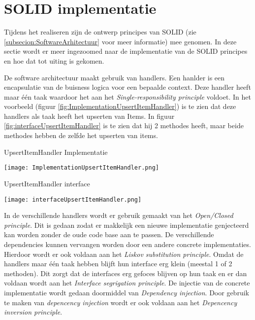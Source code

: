 \section{SOLID implementatie}
Tijdens het realiseren zijn de ontwerp principes van SOLID (zie \ref{subsecion:SoftwareArhitectuur} voor meer informatie) mee genomen.
In deze sectie wordt er meer ingezoomed naar de implementatie van de SOLID principes en hoe dat tot uiting is gekomen.

\whitespace
De software architectuur maakt gebruik van handlers.
Een hanlder is een encapsulatie van de buisness logica voor een bepaalde context.
Deze handler heeft maar één taak waardoor het aan het \textit{Single-responsibility principle} voldoet.
In het voorbeeld (figuur \ref{fig:ImplementationUpsertItemHandler}) is te zien dat deze handlers als taak heeft het upserten van Items.
In figuur \ref{fig:interfaceUpsertItemHandler} is te zien dat hij 2 methodes heeft, maar beide methodes hebben de zelfde  het upserten van items.

\whitespace
\begin{graphic}
    \captionsetup{type=figure}
    \caption{UpsertItemHandler Implementatie}
    \texttt{[image: ImplementationUpsertItemHandler.png]}
    \label{fig:ImplementationUpsertItemHandler}
\end{graphic}

\whitespace[2]
\begin{graphic}
    \captionsetup{type=figure}
    \caption{UpsertItemHandler interface}
    \texttt{[image: interfaceUpsertItemHandler.png]}
    \label{fig:interfaceUpsertItemHandler}
\end{graphic}


\whitespace[2]
In de verschillende handlers wordt er gebruik gemaakt van het \textit{Open\slash Closed principle}.
Dit is gedaan zodat er makkelijk een nieuwe implementatie genjecteerd kan worden zonder de oude code base aan te passen.
De verschillende dependencies kunnen vervangen worden door een andere concrete implementaties.
Hierdoor wordt er ook voldaan aan het \textit{Liskov substitution principle}.
Omdat de handlers maar één taak hebben blijft hun interface erg klein (meestal 1 of 2 methoden).
Dit zorgt dat de interfaces erg gefoces blijven op hun taak en er dan voldaan wordt aan het \textit{Interface segrigation principle}.
De injectie van de concrete implementatie wordt gedaan doormiddel van \textit{Dependency injection}.
Door gebruik te maken van \textit{depencency injection} wordt er ook voldaan aan het \textit{Depencency inversion principle}.


